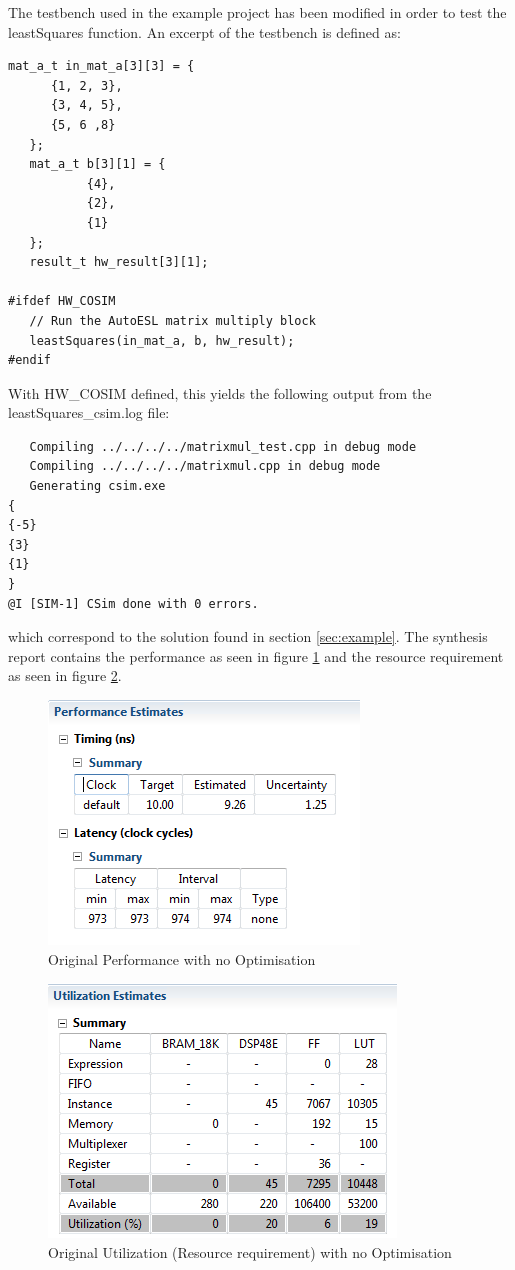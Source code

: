 The testbench used in the example project has been modified in order to test the leastSquares function. An excerpt of the testbench is defined as:
\begin{lstlisting}[caption={Excerpt of the testbench code},label=tstbnch]
   mat_a_t in_mat_a[3][3] = {
      {1, 2, 3},
      {3, 4, 5},
      {5, 6 ,8}
   };
   mat_a_t b[3][1] = {
		   {4},
		   {2},
		   {1}
   };
   result_t hw_result[3][1];

#ifdef HW_COSIM
   // Run the AutoESL matrix multiply block
   leastSquares(in_mat_a, b, hw_result);
#endif
\end{lstlisting}
With HW\_COSIM defined, this yields the following output from the leastSquares\_csim.log file:
\begin{verbatim}
   Compiling ../../../../matrixmul_test.cpp in debug mode
   Compiling ../../../../matrixmul.cpp in debug mode
   Generating csim.exe
{
{-5}
{3}
{1}
}
@I [SIM-1] CSim done with 0 errors.
\end{verbatim}
which correspond to the solution found in section \ref{sec:example}. The synthesis report contains the performance as seen in figure \ref{fig:OrigPer} and the resource requirement as seen in figure \ref{fig:OrigUtil}.
\begin{figure}[H]
\centering
\includegraphics[scale=1]{billeder/OriginalPerform}
\caption{Original Performance with no Optimisation}
\label{fig:OrigPer}
\end{figure}
\begin{figure}[H]
\centering
\includegraphics[scale=1]{billeder/OriginalUtil}
\caption{Original Utilization (Resource requirement) with no Optimisation}
\label{fig:OrigUtil}
\end{figure}
